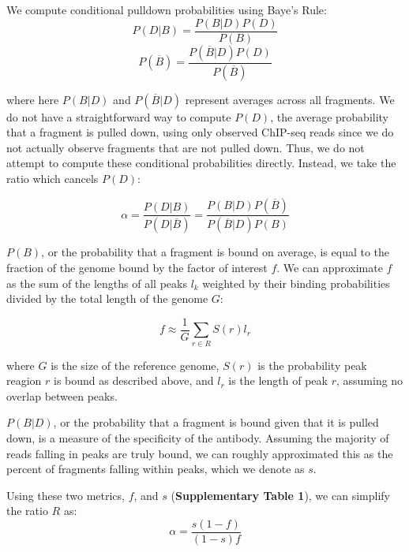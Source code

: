 \documentclass[12pt]{article}
\begin{document}
We compute conditional pulldown probabilities using Baye's Rule:
\begin{equation}
  P(D|B) = \frac{P(B|D)P(D)}{P(B)}
\end{equation}
\begin{equation}
  P(\overline{B}) = \frac{P(\overline{B}|D)P(D)}{P(\overline{B})}
\end{equation}

where here $P(B|D)$ and $P(\overline{B}|D)$ represent averages across all fragments.
We do not have a straightforward way to compute $P(D)$, the average probability that a fragment is pulled down, using only observed ChIP-seq reads since we do not actually observe fragments that are not pulled down.
Thus, we do not attempt to compute these conditional probabilities directly.
Instead, we take the ratio which cancels $P(D)$:

\begin{equation}
\alpha = \frac{P(D|B)}{P(D|\overline{B})} = \frac{P(B|D)P(\overline{B})}{P(\overline{B}|D)P(B)}
\end{equation}

$P(B)$, or the probability that a fragment is bound on average, is equal to the fraction of the genome bound by the factor of interest $f$.
We can approximate $f$ as the sum of the lengths of all peaks $l_k$ weighted by their binding probabilities divided by the total length of the genome $G$:

\begin{equation}
  f \approx \frac{1}{G} \sum_{r \in R} S(r)l_r
\end{equation}

where $G$ is the size of the reference genome, $S(r)$ is the probability peak reagion $r$ is bound as described above, and $l_r$ is the length of peak $r$, assuming no overlap between peaks. %

$P(B|D)$, or the probability that a fragment is bound given that it is pulled down, is a measure of the specificity of the antibody. Assuming the majority of reads falling in peaks are truly bound, we can roughly approximated this as the percent of fragments falling within peaks, which we denote as $s$.

Using these two metrics, $f$, and $s$ (\textbf{Supplementary Table 1}), we can simplify the ratio $R$ as:
\begin{equation} \label{eq:ratiosimple}
  \alpha = \frac{s(1-f)}{(1-s)f}
\end{equation}
\end{document}
